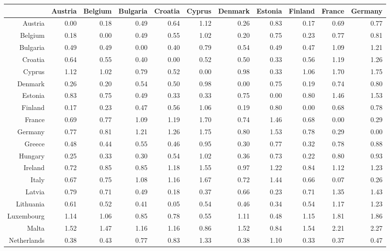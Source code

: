 \documentclass[a4paper,twoside,10pt]{article}
\begin{document}
	\begin{table}[ht]
		\footnotesize
		\centering
		\tabcolsep=0.11cm
		\begin{tabular}{r|rrrrrrrrrr}
			\hline
			& Austria & Belgium & Bulgaria & Croatia & Cyprus & Denmark & Estonia & Finland & France & Germany \\
			\hline
			Austria & 0.00 & 0.18 & 0.49 & 0.64 & 1.12 & 0.26 & 0.83 & 0.17 & 0.69 & 0.77 \\
			Belgium & 0.18 & 0.00 & 0.49 & 0.55 & 1.02 & 0.20 & 0.75 & 0.23 & 0.77 & 0.81 \\
			Bulgaria & 0.49 & 0.49 & 0.00 & 0.40 & 0.79 & 0.54 & 0.49 & 0.47 & 1.09 & 1.21 \\
			Croatia & 0.64 & 0.55 & 0.40 & 0.00 & 0.52 & 0.50 & 0.33 & 0.56 & 1.19 & 1.26 \\
			Cyprus & 1.12 & 1.02 & 0.79 & 0.52 & 0.00 & 0.98 & 0.33 & 1.06 & 1.70 & 1.75 \\
			Denmark & 0.26 & 0.20 & 0.54 & 0.50 & 0.98 & 0.00 & 0.75 & 0.19 & 0.74 & 0.80 \\
			Estonia & 0.83 & 0.75 & 0.49 & 0.33 & 0.33 & 0.75 & 0.00 & 0.80 & 1.46 & 1.53 \\
			Finland & 0.17 & 0.23 & 0.47 & 0.56 & 1.06 & 0.19 & 0.80 & 0.00 & 0.68 & 0.78 \\
			France & 0.69 & 0.77 & 1.09 & 1.19 & 1.70 & 0.74 & 1.46 & 0.68 & 0.00 & 0.29 \\
			Germany & 0.77 & 0.81 & 1.21 & 1.26 & 1.75 & 0.80 & 1.53 & 0.78 & 0.29 & 0.00 \\
			Greece & 0.48 & 0.44 & 0.55 & 0.46 & 0.95 & 0.30 & 0.77 & 0.32 & 0.78 & 0.88 \\
			Hungary & 0.25 & 0.33 & 0.30 & 0.54 & 1.02 & 0.36 & 0.73 & 0.22 & 0.80 & 0.93 \\
			Ireland & 0.72 & 0.85 & 0.85 & 1.18 & 1.55 & 0.97 & 1.22 & 0.84 & 1.12 & 1.23 \\
			Italy & 0.67 & 0.75 & 1.08 & 1.16 & 1.67 & 0.72 & 1.44 & 0.66 & 0.07 & 0.26 \\
			Latvia & 0.79 & 0.71 & 0.49 & 0.18 & 0.37 & 0.66 & 0.23 & 0.71 & 1.35 & 1.43 \\
			Lithuania & 0.61 & 0.52 & 0.41 & 0.05 & 0.54 & 0.46 & 0.34 & 0.54 & 1.17 & 1.23 \\
			Luxembourg & 1.14 & 1.06 & 0.85 & 0.78 & 0.55 & 1.11 & 0.48 & 1.15 & 1.81 & 1.86 \\
			Malta & 1.52 & 1.47 & 1.16 & 1.16 & 0.86 & 1.52 & 0.84 & 1.54 & 2.21 & 2.27 \\
			Netherlands & 0.38 & 0.43 & 0.77 & 0.83 & 1.33 & 0.38 & 1.10 & 0.33 & 0.37 & 0.47 \\

\end{tabular}
\end{table}
\end{document}

